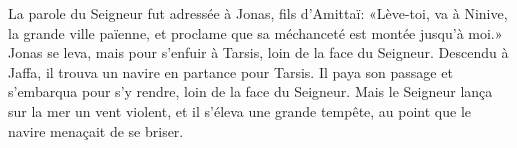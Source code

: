 La parole du Seigneur fut adressée à Jonas, fils d’Amittaï:
	«Lève-toi, va à Ninive, la grande ville païenne,
	et proclame que sa méchanceté est montée jusqu’à moi.»
Jonas se leva, mais pour s’enfuir à Tarsis, loin de la face du Seigneur.
Descendu à Jaffa, il trouva un navire en partance pour Tarsis.
	Il paya son passage et s’embarqua pour s’y rendre, loin de la face du Seigneur.
Mais le Seigneur lança sur la mer un vent violent,
	et il s’éleva une grande tempête, au point que le navire menaçait de se briser.
